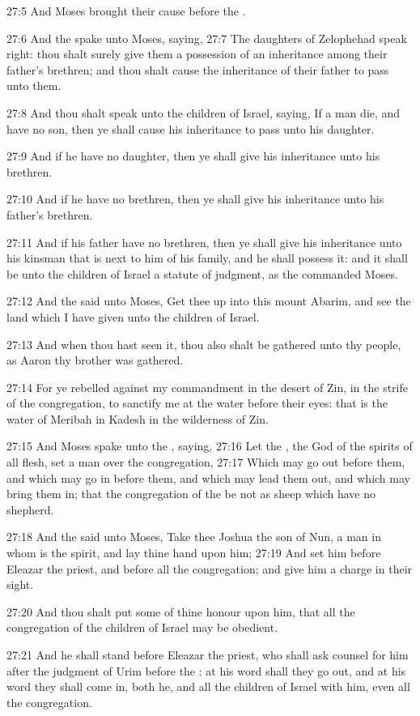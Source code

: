 27:5 And Moses brought their cause before the \LORD.

27:6 And the \LORD spake unto Moses, saying, 27:7 The daughters of Zelophehad speak right: thou shalt surely give them a possession of an inheritance among their father's brethren; and thou shalt cause the inheritance of their father to pass unto them.

27:8 And thou shalt speak unto the children of Israel, saying, If a man die, and have no son, then ye shall cause his inheritance to pass unto his daughter.

27:9 And if he have no daughter, then ye shall give his inheritance unto his brethren.

27:10 And if he have no brethren, then ye shall give his inheritance unto his father's brethren.

27:11 And if his father have no brethren, then ye shall give his inheritance unto his kinsman that is next to him of his family, and he shall possess it: and it shall be unto the children of Israel a statute of judgment, as the \LORD commanded Moses.

27:12 And the \LORD said unto Moses, Get thee up into this mount Abarim, and see the land which I have given unto the children of Israel.

27:13 And when thou hast seen it, thou also shalt be gathered unto thy people, as Aaron thy brother was gathered.

27:14 For ye rebelled against my commandment in the desert of Zin, in the strife of the congregation, to sanctify me at the water before their eyes: that is the water of Meribah in Kadesh in the wilderness of Zin.

27:15 And Moses spake unto the \LORD, saying, 27:16 Let the \LORD, the God of the spirits of all flesh, set a man over the congregation, 27:17 Which may go out before them, and which may go in before them, and which may lead them out, and which may bring them in; that the congregation of the \LORD be not as sheep which have no shepherd.

27:18 And the \LORD said unto Moses, Take thee Joshua the son of Nun, a man in whom is the spirit, and lay thine hand upon him; 27:19 And set him before Eleazar the priest, and before all the congregation; and give him a charge in their sight.

27:20 And thou shalt put some of thine honour upon him, that all the congregation of the children of Israel may be obedient.

27:21 And he shall stand before Eleazar the priest, who shall ask counsel for him after the judgment of Urim before the \LORD: at his word shall they go out, and at his word they shall come in, both he, and all the children of Israel with him, even all the congregation.

